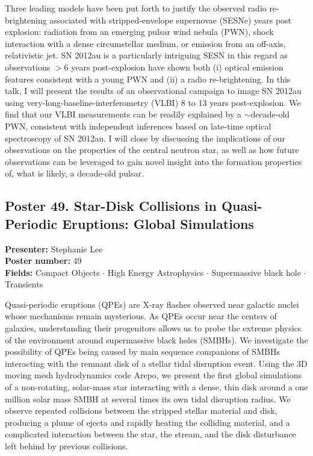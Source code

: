 Three leading models have been put forth to justify the observed radio re-brightening associated with stripped-envelope supernovae (SESNe) years post explosion: radiation from an emerging pulsar wind nebula (PWN), shock interaction with a dense circumstellar medium, or emission from an off-axis, relativistic jet. SN 2012au is a particularly intriguing SESN in this regard as observations $>$6 years post-explosion have shown both (i) optical emission features consistent with a young PWN and (ii) a radio re-brightening. In this talk, I will present the results of an observational campaign to image SN 2012au using very-long-baseline-interferometry (VLBI) 8 to 13 years post-explosion. We find that our VLBI measurements can be readily explained by a $\sim$decade-old PWN, consistent with independent inferences based on late-time optical spectroscopy of SN 2012au. I will close by discussing the implications of our observations on the properties of the central neutron star, as well as how future observations can be leveraged to gain novel insight into the formation properties of, what is likely, a decade-old pulsar.

\hypertarget{poster-abstract-talk-309}{}\label{poster-abstract-page-talk-309}
\subsection*{Poster 49. Star-Disk Collisions in Quasi-Periodic Eruptions: Global Simulations}
\textbf{Presenter:} Stephanie Lee\\
\textbf{Poster number:} 49\\
\textbf{Fields:} Compact Objects $\cdot$ High Energy Astrophysics $\cdot$ Supermassive black hole $\cdot$ Transients

Quasi-periodic eruptions (QPEs) are X-ray flashes observed near galactic nuclei whose mechanisms remain mysterious. As QPEs occur near the centers of galaxies, understanding their progenitors allows us to probe the extreme physics of the environment around supermassive black holes (SMBHs). We investigate the possibility of QPEs being caused by main sequence companions of SMBHs interacting with the remnant disk of a stellar tidal disruption event. Using the 3D moving mesh hydrodynamics code Arepo, we present the first global simulations of a non-rotating, solar-mass star interacting with a dense, thin disk around a one million solar mass SMBH at several times its own tidal disruption radius. We observe repeated collisions between the stripped stellar material and disk, producing a plume of ejecta and rapidly heating the colliding material, and a complicated interaction between the star, the stream, and the disk disturbance left behind by previous collisions.

